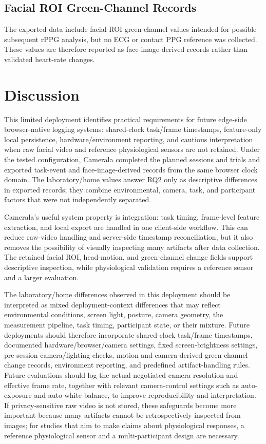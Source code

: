 \documentclass[dvipdfmx]{ehis}
\begin{document}
\subsection{Facial ROI Green-Channel Records}
The exported data include facial ROI green-channel values intended for possible subsequent rPPG analysis, but no ECG or contact PPG reference was collected.
These values are therefore reported as face-image-derived records rather than validated heart-rate changes.

\section{Discussion}

This limited deployment identifies practical requirements for future edge-side browser-native logging systems: shared-clock task/frame timestamps, feature-only local persistence, hardware/environment reporting, and cautious interpretation when raw facial video and reference physiological sensors are not retained.
Under the tested configuration, Camerala completed the planned sessions and trials and exported task-event and face-image-derived records from the same browser clock domain.
The laboratory/home values answer RQ2 only as descriptive differences in exported records; they combine environmental, camera, task, and participant factors that were not independently separated.

Camerala's useful system property is integration: task timing, frame-level feature extraction, and local export are handled in one client-side workflow.
This can reduce raw-video handling and server-side timestamp reconciliation, but it also removes the possibility of visually inspecting many artifacts after data collection.
The retained facial ROI, head-motion, and green-channel change fields support descriptive inspection, while physiological validation requires a reference sensor and a larger evaluation.

The laboratory/home differences observed in this deployment should be interpreted as mixed deployment-context differences that may reflect environmental conditions, screen light, posture, camera geometry, the measurement pipeline, task timing, participant state, or their mixture.
Future deployments should therefore incorporate shared-clock task/frame timestamps, documented hardware/browser/camera settings, fixed screen-brightness settings, pre-session camera/lighting checks, motion and camera-derived green-channel change records, environment reporting, and predefined artifact-handling rules.
Future evaluations should log the actual negotiated camera resolution and effective frame rate, together with relevant camera-control settings such as auto-exposure and auto-white-balance, to improve reproducibility and interpretation.
If privacy-sensitive raw video is not stored, these safeguards become more important because many artifacts cannot be retrospectively inspected from images; for studies that aim to make claims about physiological responses, a reference physiological sensor and a multi-participant design are necessary.
\end{document}
